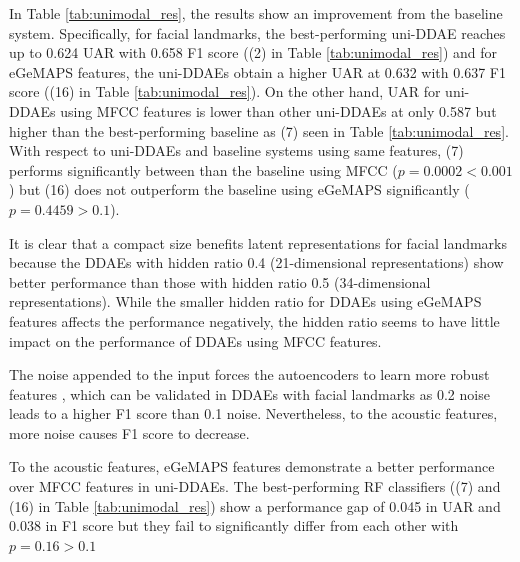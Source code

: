 In Table \ref{tab:unimodal_res}, the results show an improvement from the baseline system. Specifically, for facial landmarks, the best-performing uni-DDAE reaches up to 0.624 UAR with 0.658 F1 score ((2) in Table \ref{tab:unimodal_res}) and for eGeMAPS features, the uni-DDAEs obtain a higher UAR at 0.632 with 0.637 F1 score ((16) in Table \ref{tab:unimodal_res}). On the other hand, UAR for uni-DDAEs using MFCC features is lower than other uni-DDAEs at only 0.587 but higher than the best-performing baseline as (7) seen in Table \ref{tab:unimodal_res}. With respect to uni-DDAEs and baseline systems using same features, (7) performs significantly between than the baseline using MFCC ($p = 0.0002 < 0.001$) but (16) does not outperform the baseline using eGeMAPS significantly ($p = 0.4459 > 0.1$).

It is clear that a compact size benefits latent representations for facial landmarks because the DDAEs with hidden ratio 0.4 (21-dimensional representations) show better performance than those with hidden ratio 0.5 (34-dimensional representations). While the smaller hidden ratio for DDAEs using eGeMAPS features affects the performance negatively, the hidden ratio seems to have little impact on the performance of DDAEs using MFCC features. 

The noise appended to the input forces the autoencoders to learn more robust features \cite{vincent2008}, which can be validated in DDAEs with facial landmarks as 0.2 noise leads to a higher F1 score than 0.1 noise. Nevertheless, to the acoustic features, more noise causes F1 score to decrease.

To the acoustic features, eGeMAPS features demonstrate a better performance over MFCC features in uni-DDAEs. The best-performing RF classifiers ((7) and (16) in Table \ref{tab:unimodal_res}) show a performance gap of 0.045 in UAR and 0.038 in F1 score but they fail to significantly differ from each other with $p = 0.16 > 0.1$


